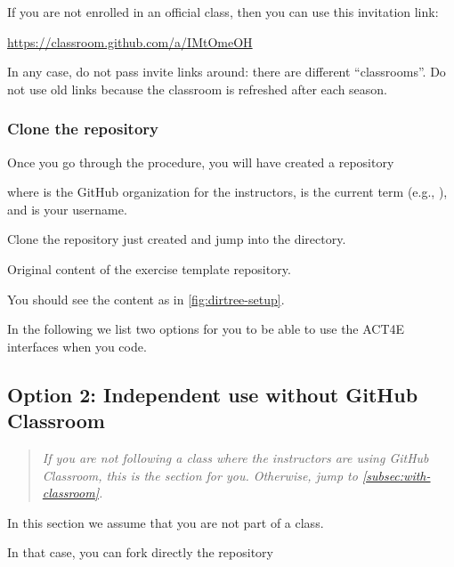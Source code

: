 If you are not enrolled in an official class, then you can use this invitation link:

\url{https://classroom.github.com/a/IMtOmeOH}

In any case, do not pass invite links around: there are different ``classrooms''.
Do not use old links because the classroom is refreshed after each season.

\subsubsection{Clone the repository}

Once you go through the procedure, you will have created a repository

\begin{quote}
\end{quote}
where  is the GitHub organization for the instructors,  is the current term (e.g., ), and  is your username.

Clone the repository just created and jump into the directory.

\begin{marginfigure}
    \caption{Original content of the exercise template repository.}
    \label{fig:dirtree-setup}
\end{marginfigure}

You should see the content as in \cref{fig:dirtree-setup}.

In the following we list two options for you to be able to use the ACT4E interfaces when you code.

\subsection{Option 2: Independent use without GitHub Classroom}
\label{subsec:without-classroom}

\begin{quote}
    \emph{
        If you are \emph{not} following a class where the instructors are using GitHub Classroom,
        this is the section for you.
        Otherwise, jump to \cref{subsec:with-classroom}.
    }
\end{quote}

In this section we assume that you are not part of a class.

In that case, you can fork directly the repository

